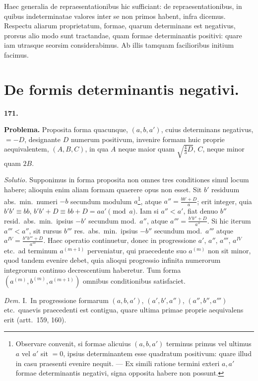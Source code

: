 \documentclass[12pt,a4paper]{article}
\theoremstyle{plain}
\theoremstyle{definition}
\theoremstyle{remark}
\begin{document}
Haec generalia de repraesentationibus hic sufficiant: de repraesentationibus, in quibus indeterminatae valores inter se non primos habent, infra dicemus. Respectu aliarum proprietatum, formae, quarum determinans est negativus, prorsus alio modo sunt tractandae, quam formae determinantis positivi: quare iam utrasque seorsim considerabimus. Ab illis tamquam facilioribus initium facimus.

\section*{De formis determinantis negativi.}

\textbf{171.}

\textbf{Problema.} Proposita forma quacunque, $(a,b,a')$, cuius determinans negativus, $=-D$, designante $D$ numerum positivum, invenire formam huic proprie aequivalentem, $(A,B,C)$, in qua $A$ neque maior quam $\sqrt{\frac{4}{3}D}$, $C$, neque minor quam $2B$.

\textit{Solutio.} Supponimus in forma proposita non omnes tres conditiones simul locum habere; alioquin enim aliam formam quaerere opus non esset. Sit $b'$ residuum abs.\ min.\ numeri $-b$ secundum modulum $a$\footnote{Observare convenit, si formae alicuius $(a,b,a')$ terminus primus vel ultimus $a$ vel $a'$ sit $=0$, ipsius determinantem esse quadratum positivum: quare illud in casu praesenti evenire nequit. --- Ex simili ratione termini exteri $a,a'$ formae determinantis negativi, signa opposita habere non possunt.}, atque $a''=\frac{bb'+D}{a}$; erit integer, quia $b'b'\equiv bb$, $b'b'+D\equiv bb+D=aa'\pmod{a}$. Iam si $a''<a'$, fiat denuo $b''$ resid.\ abs.\ min.\ ipsius $-b'$ secundum mod.\ $a''$, atque $a'''=\frac{b'b''+D}{a''}$. Si hic iterum $a'''<a''$, sit rursus $b'''$ res.\ abs.\ min.\ ipsius $-b''$ secundum mod.\ $a'''$ atque $a^{IV}=\frac{b''b'''+D}{a'''}$. Haec operatio continuetur, donec in progressione $a'$, $a''$, $a'''$, $a^{IV}$ etc.\ ad terminum $a^{(m+1)}$ perveniatur, qui praecedente suo $a^{(m)}$ non sit minor, quod tandem evenire debet, quia alioqui progressio infinita numerorum integrorum continuo decrescentium haberetur. Tum forma $(a^{(m)},b^{(m)},a^{(m+1)})$ omnibus conditionibus satisfaciet.

\textit{Dem.} I.\ In progressione formarum $(a,b,a')$, $(a',b',a'')$, $(a'',b'',a''')$ etc.\ quaevis praecedenti est contigua, quare ultima primae proprie aequivalens erit (artt.\ 159, 160).
\end{document}
